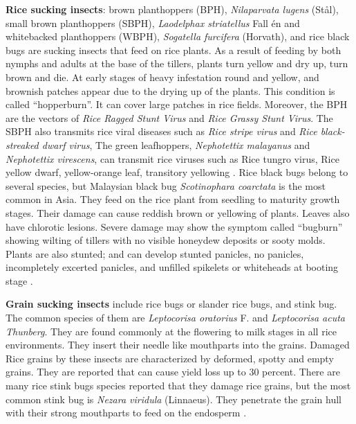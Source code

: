 \textbf{Rice sucking insects}: brown planthoppers (BPH), \textit{Nilaparvata lugens} (St\aa l), small brown planthoppers (SBPH), \textit{Laodelphax striatellus} Fall \'en and whitebacked planthoppers (WBPH), \textit{Sogatella furcifera} (Horvath), and rice black bugs are sucking insects that feed on rice plants. As a result of feeding by both nymphs and adults at the base of the tillers, plants turn yellow and dry up, turn brown and die. At early stages of heavy infestation round and yellow, and brownish patches appear due to the drying up of the plants. This condition is called ``hopperburn''. It can cover large patches in rice fields. Moreover, the BPH are the vectors of \textit{Rice Ragged Stunt Virus} and \textit{Rice Grassy Stunt Virus}. The SBPH also transmits rice viral diseases such as \textit{Rice stripe virus} and \textit{Rice black-streaked dwarf virus}, The green leafhoppers, \textit{Nephotettix malayanus} and \textit{Nephotettix virescens}, can transmit rice viruses such as Rice tungro virus, Rice yellow dwarf, yellow-orange leaf, transitory yellowing \citep{Ling_1972_Rice}. Rice black bugs belong to several species, but Malaysian black bug \textit{Scotinophara coarctata} is the most common in Asia. They feed on the rice plant from seedling to maturity growth stages. Their damage can cause reddish brown or yellowing of plants. Leaves also have chlorotic lesions. Severe damage may show the symptom called ``bugburn'' showing wilting of tillers with no visible honeydew deposits or sooty molds. Plants are also stunted; and can develop stunted panicles, no panicles, incompletely excerted panicles, and unfilled spikelets or whiteheads at booting stage \citep{Shepard_1995_Rice}. 

\textbf{Grain sucking insects} include rice bugs or slander rice bugs, and stink bug. The common species of them are \textit{Leptocorisa oratorius} F. and \textit{Leptocorisa acuta Thunberg}. They are found commonly at the flowering to milk stages in all rice environments. They insert their needle like mouthparts into the grains. Damaged Rice grains by these insects are characterized by deformed, spotty and empty grains. They are reported that can cause yield loss up to 30 percent. There are many rice stink bugs species reported that they damage rice grains, but the most common stink bug is \textit{Nezara viridula} (Linnaeus). They penetrate the grain hull with their strong mouthparts to feed on the endosperm \citep{Shepard_1995_Rice}. 


